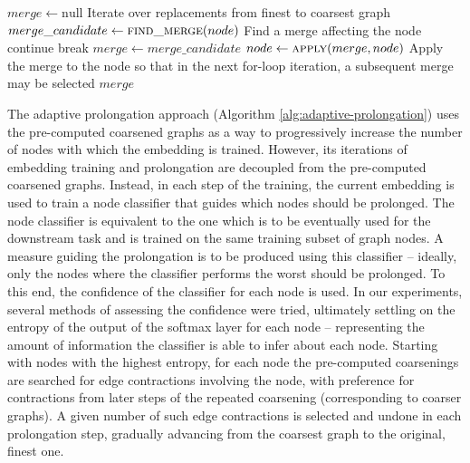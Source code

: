 \begin{algorithm}
\begin{algorithmic}
    \Statex
        \State $ merge \gets \mathrm{null} $
         \Comment Iterate over replacements from finest to coarsest graph
            \State $ merge\_candidate \gets \Call{find\_merge}{node} $ \Comment Find a merge affecting the node
                \State continue
            \EndIf
                \State break
            \EndIf
            \State $ merge \gets merge\_candidate $
            \State $ node \gets \Call{apply}{merge, node} $ \Comment Apply the merge to the node so that in the next for-loop iteration, a subsequent merge may be selected
        \EndFor
        \State \Return $ merge $
    \EndFunction
  \end{algorithmic}
\end{algorithm}

The adaptive prolongation approach (Algorithm \ref{alg:adaptive-prolongation}) uses the pre-computed coarsened graphs as a way to progressively increase the number of nodes with which the embedding is trained. However, its iterations of embedding training and prolongation are decoupled from the pre-computed coarsened graphs. Instead, in each step of the training, the current embedding is used to train a node classifier that guides which nodes should be prolonged. The node classifier is equivalent to the one which is to be eventually used for the downstream task and is trained on the same training subset of graph nodes. A measure guiding the prolongation is to be produced using this classifier -- ideally, only the nodes where the classifier performs the worst should be prolonged. To this end, the confidence of the classifier for each node is used. In our experiments, several methods of assessing the confidence were tried, ultimately settling on the entropy of the output of the softmax layer for each node -- representing the amount of information the classifier is able to infer about each node. Starting with nodes with the highest entropy, for each node the pre-computed coarsenings are searched for edge contractions involving the node, with preference for contractions from later steps of the repeated coarsening (corresponding to coarser graphs). A given number of such edge contractions is selected and undone in each prolongation step, gradually advancing from the coarsest graph to the original, finest one.


